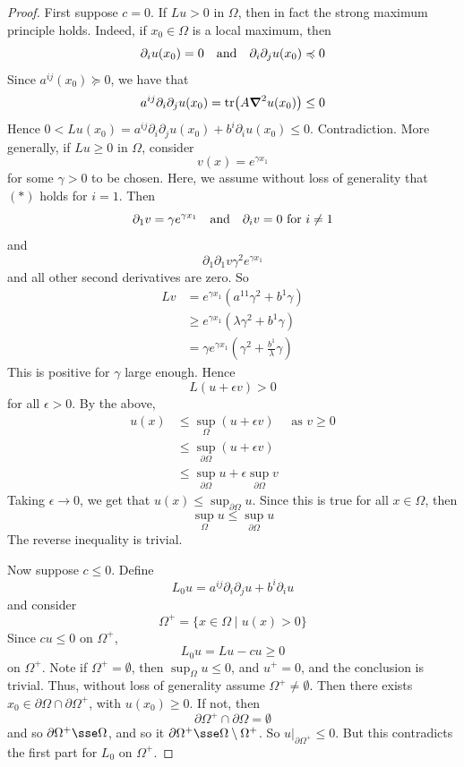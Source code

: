 \documentclass{article}
\begin{document}
\begin{proof}
    First suppose \(c = 0\). If \(Lu > 0\) in \(\Omega\), then in fact the strong maximum principle holds. Indeed, if \(x_0 \in \Omega\) is a local maximum, then
    \[\partial_i u(x_0) = 0 \qqtext{and} \partial_i\partial_j u(x_0) \preccurlyeq 0\]
    Since \(a^{ij}(x_0) \succcurlyeq 0\), we have that 
    \[a^{ij}\partial_i\partial_ju(x_0) = \tr(A \grad^2u(x_0)) \le 0\]
    Hence \(0 < Lu(x_0) = a^{ij}\partial_i\partial_j u(x_0) + b^i\partial_iu(x_0) \le 0\). Contradiction. More generally, if \(Lu \ge 0\) in \(\Omega\), consider
    \[v(x) = e^{\gamma x_1}\]
    for some \(\gamma > 0\) to be chosen. Here, we assume without loss of generality that \((*)\) holds for \(i = 1\). Then
    \[\partial_1 v = \gamma e^{\gamma x_1} \qqtext{and}\partial_i v = 0 \text{ for }i \ne 1\]
    and
    \[\partial_1\partial_1 v \gamma^2 e^{\gamma x_1}\]
    and all other second derivatives are zero. So
    \begin{align*}
        Lv &= e^{\gamma x_1}(a^{11}\gamma^2 + b^1\gamma) \\
        &\ge e^{\gamma x_1}(\lambda \gamma^2 + b^1\gamma) \\
        &= \gamma e^{\gamma x_1}\left(\gamma^2 + \frac{b^1}{\lambda}\gamma\right)
    \end{align*}
    This is positive for \(\gamma\) large enough. Hence
    \[L(u + \epsilon v) > 0\]
    for all \(\epsilon > 0\). By the above,
    \begin{align*}
        u(x) &\le \sup_{\Omega}(u + \epsilon v) \quad\text{ as }v \ge 0\\
        &\le \sup_{\partial\Omega}(u + \epsilon v) \\
        &\le \sup_{\partial\Omega} u + \epsilon\sup_{\partial\Omega}v
    \end{align*}
    Taking \(\epsilon \to 0\), we get that \(u(x) \le \sup_{\partial\Omega} u\). Since this is true for all \(x \in \Omega\), then
    \[\sup_\Omega u \le \sup_{\partial \Omega} u\]
    The reverse inequality is trivial.

    Now suppose \(c \le 0\). Define
    \[L_0u = a^{ij}\partial_i\partial_j u + b^i\partial_i u\]
    and consider
    \[\Omega^+ = \{x \in \Omega \mid u(x) > 0\}\]
    Since \(cu \le 0\) on \(\Omega^+\),
    \[L_0u = Lu - cu \ge 0\]
    on \(\Omega^+\). Note if \(\Omega^+ = \emptyset\), then \(\sup_\Omega u \le 0\), and \(u^+ = 0\), and the conclusion is trivial. Thus, without loss of generality assume \(\Omega^+ \ne \emptyset\). Then there exists \(x_0\in \partial\Omega \cap \partial\Omega^+\), with \(u(x_0) \ge 0\). If not, then
    \[\partial\Omega^+  \cap \partial\Omega = \emptyset\]
    and so \(\partial\Omega^+ \sse \Omega\), and so it \(\partial\Omega^+ \sse \Omega \setminus \Omega^+\).  So \(u\vert_{\partial\Omega^+} \le 0\). But this contradicts the first part for \(L_0\) on \(\Omega^+\).


\end{proof}
\end{document}

